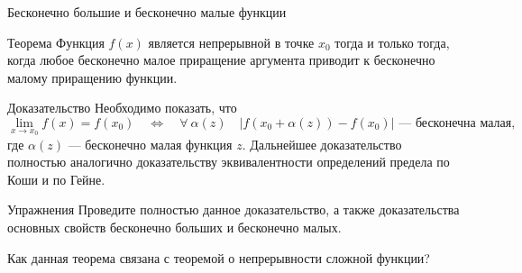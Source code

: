 \documentclass[8pt]{beamer}
\begin{document}
\begin{frame}{Бесконечно большие и бесконечно малые функции}
\begin{block}{Теорема}
Функция $f(x)$ является непрерывной в точке $x_0$ тогда и только тогда, когда
любое бесконечно малое приращение аргумента приводит к бесконечно малому приращению функции.
\end{block}
\begin{block}{Доказательство}
Необходимо показать, что
$$\lim_{x\to x_0} f(x) = f(x_0) \quad \Leftrightarrow \quad \forall\ \alpha(z)\quad
\text{$|f(x_0+\alpha(z))-f(x_0)|$ --- бесконечна малая,}$$
где $\alpha(z)$ --- бесконечно малая функция $z$.
Дальнейшее доказательство полностью аналогично доказательству эквивалентности определений предела по Коши и по Гейне.
\end{block}
\begin{block}{Упражнения}
Проведите полностью данное доказательство, а также доказательства основных свойств бесконечно больших и бесконечно малых. 

Как данная теорема связана с теоремой о непрерывности сложной функции?
\end{block}
\end{frame}

\end{document}
